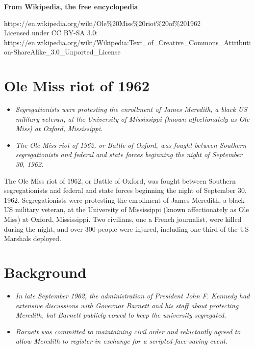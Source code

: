 \textbf{From Wikipedia, the free encyclopedia}

https://en.wikipedia.org/wiki/Ole\%20Miss\%20riot\%20of\%201962\\
Licensed under CC BY-SA 3.0:\\
https://en.wikipedia.org/wiki/Wikipedia:Text\_of\_Creative\_Commons\_Attribution-ShareAlike\_3.0\_Unported\_License

\section{Ole Miss riot of 1962}\label{ole-miss-riot-of-1962}

\begin{itemize}
\item
  \emph{Segregationists were protesting the enrollment of James
  Meredith, a black US military veteran, at the University of
  Mississippi (known affectionately as Ole Miss) at Oxford,
  Mississippi.}
\item
  \emph{The Ole Miss riot of 1962, or Battle of Oxford, was fought
  between Southern segregationists and federal and state forces
  beginning the night of September 30, 1962.}
\end{itemize}

The Ole Miss riot of 1962, or Battle of Oxford, was fought between
Southern segregationists and federal and state forces beginning the
night of September 30, 1962. Segregationists were protesting the
enrollment of James Meredith, a black US military veteran, at the
University of Mississippi (known affectionately as Ole Miss) at Oxford,
Mississippi. Two civilians, one a French journalist, were killed during
the night, and over 300 people were injured, including one-third of the
US Marshals deployed.

\section{Background}\label{background}

\begin{itemize}
\item
  \emph{In late September 1962, the administration of President John F.
  Kennedy had extensive discussions with Governor Barnett and his staff
  about protecting Meredith, but Barnett publicly vowed to keep the
  university segregated.}
\item
  \emph{Barnett was committed to maintaining civil order and reluctantly
  agreed to allow Meredith to register in exchange for a scripted
  face-saving event.}
\end{itemize}


